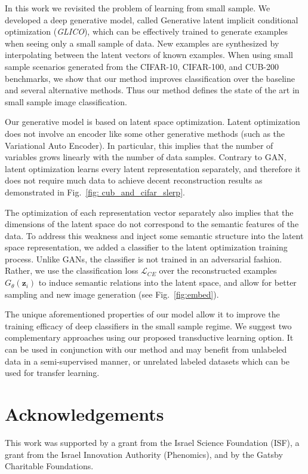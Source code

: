 \documentclass[a4paper,conference]{IEEEtran}
\newcommand{\bz}{{\mathbf z}}
\begin{document}
In this work we revisited the problem of learning from small sample. We developed a deep generative model, called Generative latent implicit conditional optimization (\textit{GLICO}), which can be effectively trained to generate examples when seeing only a small sample of data. New examples are synthesized by interpolating between the latent vectors of known examples. When using small sample scenarios generated from the CIFAR-10, CIFAR-100, and CUB-200 benchmarks, we show that our method improves classification over the baseline and several alternative methods. Thus our method defines the state of the art in small sample image classification.

Our generative model is based on latent space optimization. Latent optimization does not involve an encoder like some other generative methods (such as the Variational Auto Encoder). In particular, this implies that the number of variables grows linearly with the number of data samples. Contrary to GAN, latent optimization learns every latent representation separately, and therefore it does not require much data to achieve decent reconstruction results as demonstrated in Fig.~\ref{fig: cub_and_cifar_slerp}. 

The optimization of each representation vector separately also implies that the dimensions of the latent space do not correspond to the semantic features of the data. To address this weakness and inject some semantic structure into the latent space representation, we added a classifier to the latent optimization training process. Unlike GANs, the classifier is not trained in an adversarial fashion. Rather, we use the classification loss $\mathcal{L}_{CE}$ over the reconstructed examples $G_\theta(\bz_i)$ to induce semantic relations into the latent space, and allow for better sampling and new image generation (see Fig.~\ref{fig:embed}).

The unique aforementioned properties of our model allow it to improve the training efficacy of deep classifiers in the small sample regime. We suggest two complementary approaches using our proposed transductive learning option. It can be used in conjunction with our method and may benefit from unlabeled data in a semi-supervised manner, or unrelated labeled datasets which can be used for transfer learning. 

\section*{Acknowledgements}
This work was supported by a grant from the Israel Science Foundation (ISF), a grant from the Israel Innovation Authority (Phenomics), and by the Gatsby Charitable Foundations.





\vspace{12pt}
\end{document}
